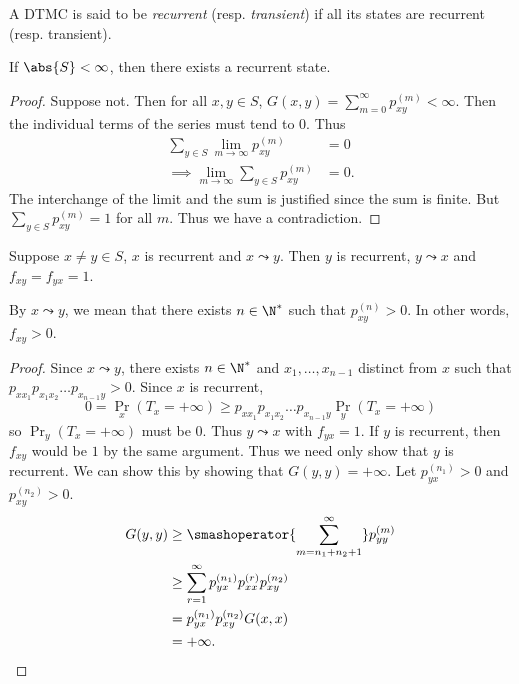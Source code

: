 \begin{definition}
    A DTMC is said to be \emph{recurrent} (resp. \emph{transient}) if all
    its states are recurrent (resp. transient).
\end{definition}

\begin{theorem}
    If $\abs{S} < \infty$, then there exists a recurrent state.
\end{theorem}
\begin{proof}
    Suppose not.
    Then for all $x, y \in S$, $G(x, y) = \sum_{m=0}^{\infty} p_{xy}^{(m)}
    < \infty$.
    Then the individual terms of the series must tend to $0$.
    Thus \begin{align*} %
        \sum_{y \in S} \lim_{m \to \infty} p_{xy}^{(m)}
            &= 0 \\
        \implies \lim_{m \to \infty} \sum_{y \in S} p_{xy}^{(m)}
            &= 0.
    \end{align*}
    The interchange of the limit and the sum is justified since the sum
    is finite.
    But $\sum_{y \in S} p_{xy}^{(m)} = 1$ for all $m$. %
    Thus we have a contradiction.
\end{proof}

\begin{theorem}
    Suppose $x \ne y \in S$, $x$ is recurrent and $x \leadsto y$.
    Then $y$ is recurrent, $y \leadsto x$ and $f_{xy} = f_{yx} = 1$.
\end{theorem}
By $x \leadsto y$, we mean that there exists $n \in \N^*$ such that
$p_{xy}^{(n)} > 0$.
In other words, $f_{xy} > 0$.
\begin{proof}
    Since $x \leadsto y$, there exists $n \in \N^*$ and $x_1,\dots,x_{n-1}$
    distinct from $x$ such that $p_{xx_1}p_{x_1x_2}\dots p_{x_{n-1}y} > 0$.
    Since $x$ is recurrent, \[
        0 = \Pr_x(T_x = +\infty)
            \ge p_{xx_1}p_{x_1x_2}\dots p_{x_{n-1}y} \Pr_y(T_x = +\infty)
    \] so $\Pr_y(T_x = +\infty)$ must be $0$.
    Thus $y \leadsto x$ with $f_{yx} = 1$.
    If $y$ is recurrent, then $f_{xy}$ would be $1$ by the same argument.
    Thus we need only show that $y$ is recurrent.
    We can show this by showing that $G(y, y) = +\infty$.
    Let $p_{yx}^{(n_1)} > 0$ and $p_{xy}^{(n_2)} > 0$.
    \begin{align*}
        G(y, y) &\ge \smashoperator{\sum_{m=n_1+n_2+1}^{\infty}}
                    p_{yy}^{(m)} \\
                &\ge \sum_{r=1}^{\infty} p_{yx}^{(n_1)}
                    p_{xx}^{(r)} p_{xy}^{(n_2)} \\
                &= p_{yx}^{(n_1)} p_{xy}^{(n_2)} G(x, x) \\
                &= +\infty. \qedhere
    \end{align*}
\end{proof}
